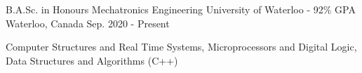 

\begin{cventries}

  \cventry
    {B.A.Sc. in Honours Mechatronics Engineering} %
    {University of Waterloo - 92\% GPA} %
    {Waterloo, Canada} %
    {Sep. 2020 - Present} %
    {
      \begin{cvitems}
        \item{Computer Structures and Real Time Systems, Microprocessors and Digital Logic, Data Structures and Algorithms (C++)}
      \end{cvitems}
    }
\end{cventries}
